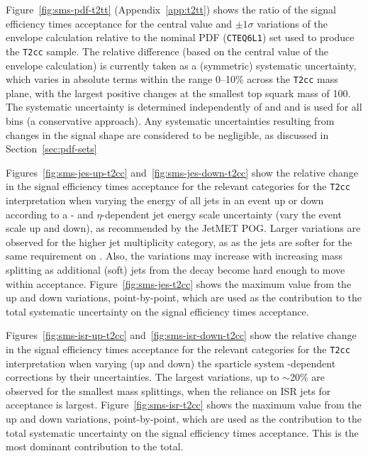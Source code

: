 Figure~\ref{fig:sms-pdf-t2tt} (Appendix~\ref{app:t2tt}) shows the
ratio of the signal efficiency times acceptance for the central value
and $\pm1\sigma$ variations of the envelope calculation relative to
the nominal PDF (\verb!CTEQ6L1!)  set used to produce the
\texttt{T2cc} sample. The relative difference (based on the central
value of the envelope calculation) is currently taken as a (symmetric)
systematic uncertainty, which varies in absolute terms within the
range 0--10\% across the \verb!T2cc! mass plane, with the largest
positive changes at the smallest top squark mass of 100\gev. The
systematic uncertainty is determined independently of \njet and \nb
and is used for all \scalht bins (a conservative approach). Any
systematic uncertainties resulting from changes in the signal shape
are considered to be negligible, as discussed in
Section~\ref{sec:pdf-sets}

Figures~\ref{fig:sms-jes-up-t2cc} and~\ref{fig:sms-jes-down-t2cc} show
the relative change in the signal efficiency times acceptance for the
relevant categories for the \verb!T2cc! interpretation when varying
the energy of all jets in an event up or down according to a \pt- and
$\eta$-dependent jet energy scale uncertainty (\ie vary the event
scale up and down), as recommended by the JetMET POG. Larger
variations are observed for the higher jet multiplicity category, as
as the jets are softer for the same requirement on \scalht. Also, the
variations may increase with increasing mass splitting as additional
(soft) jets from the decay become hard enough to move within
acceptance. Figure~\ref{fig:sms-jes-t2cc} shows the maximum value from
the up and down variations, point-by-point, which are used as the
contribution to the total systematic uncertainty on the signal
efficiency times acceptance.

Figures~\ref{fig:sms-isr-up-t2cc} and~\ref{fig:sms-isr-down-t2cc} show
the relative change in the signal efficiency times acceptance for the
relevant categories for the \verb!T2cc! interpretation when varying
(up and down) the sparticle system \Pt-dependent corrections by their
uncertainties. The largest variations, up to $\sim$20\% are observed
for the smallest mass splittings, when the reliance on ISR jets for
acceptance is largest. Figure~\ref{fig:sms-isr-t2cc} shows the maximum
value from the up and down variations, point-by-point, which are used
as the contribution to the total systematic uncertainty on the signal
efficiency times acceptance. This is the most dominant contribution to
the total. 

